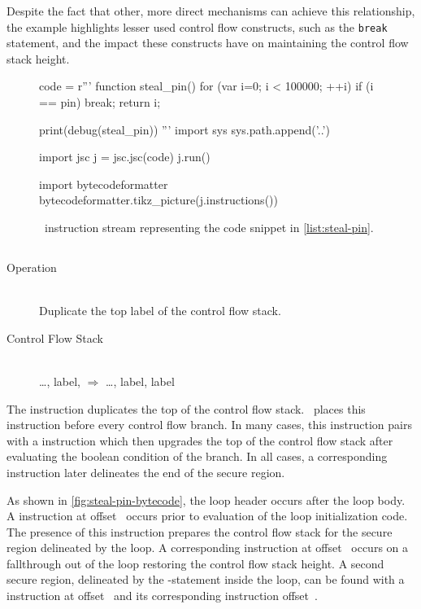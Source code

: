 Despite the fact that other, more direct mechanisms can achieve this relationship, the example highlights lesser used control flow constructs, such as the \texttt{break} statement, and the impact these constructs have on maintaining the control flow stack height.

\begin{figure}[h]
\begin{python}
code = r'''
function steal_pin() {
  for (var i=0; i < 100000; ++i) {
    if (i == pin) break;
  }
  return i;
}

print(debug(steal_pin))
'''
import sys
sys.path.append('..')

import jsc
j = jsc.jsc(code)
j.run()

import bytecodeformatter
bytecodeformatter.tikz_picture(j.instructions())
\end{python}
  \caption{\FlowCore\ instruction stream representing the code snippet in \autoref{list:steal-pin}.}
  \label{fig:steal-pin-bytecode}
\end{figure}

\subsection{\dup}

\begin{samepage}
\begin{description}
  \item[Operation] \hfill \\
    Duplicate the top label of the control flow stack.
  \item[Control Flow Stack] \hfill \\
    \ldots, label, $\Rightarrow$ \ldots, label, label
\end{description}
\end{samepage}

The \dup instruction duplicates the top of the control flow stack.
\FlowCore\ places this instruction before every control flow branch.
In many cases, this instruction pairs with a \join instruction which then upgrades the top of the control flow stack after evaluating the boolean condition of the branch.
In all cases, a corresponding \popj instruction later delineates the end of the secure region.

As shown in \autoref{fig:steal-pin-bytecode}, the loop header occurs after the loop body.
A \dup instruction at offset~ occurs prior to evaluation of the loop initialization code.
The presence of this instruction prepares the control flow stack for the secure region delineated by the loop.
A corresponding \popj instruction at offset~ occurs on a fallthrough out of the loop restoring the control flow stack height.
A second secure region, delineated by the -statement inside the loop, can be found with a \dup instruction at offset~ and its corresponding \popj instruction offset~.

